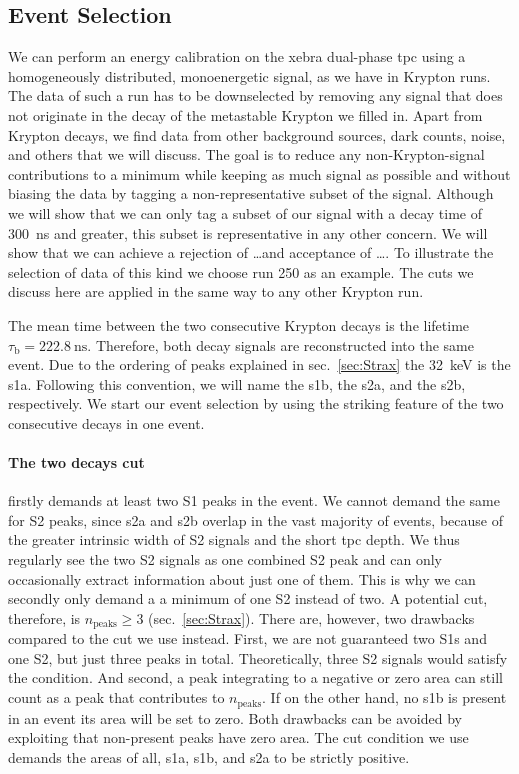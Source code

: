 
\FloatBarrier
\subsection{Event Selection}
\label{ssec:tagging}
\FloatBarrier



We can perform an energy calibration on the \gls{xebra} dual-phase \gls{tpc} using a homogeneously distributed, monoenergetic signal, as we have in Krypton runs.
The data of such a run has to be downselected by removing any signal that does not originate in the decay of the metastable Krypton we filled in.
Apart from Krypton decays, we find data from other background sources, dark counts, noise, and others that we will discuss.
The goal is to reduce any non-Krypton-signal contributions to a minimum while keeping as much signal as possible and without biasing the data by tagging a non-representative subset of the signal.
Although we will show that we can only tag a subset of our signal with a decay time of \SI{300}{\nano\s} and greater, this subset is representative in any other concern.
We will show that we can achieve a rejection of \dots and acceptance of \dots.  %
To illustrate the selection of data of this kind we choose run 250 as an example.
The cuts we discuss here are applied in the same way to any other Krypton run.


The mean time between the two consecutive Krypton decays is the lifetime $\tau_\mathrm{b} = \SI{222.8}{\nano\s}$.
Therefore, both decay signals are reconstructed into the same event.
Due to the ordering of peaks explained in sec.~\ref{sec:Strax} the \SI{32}{\kilo\eV} is the \gls{s1a}.
Following this convention, we will name the \gls{s1b}, the \gls{s2a}, and the \gls{s2b}, respectively.
We start our event selection by using the striking feature of the two consecutive decays in one event.


\paragraph{The two decays cut} firstly demands at least two S1 peaks in the event.
We cannot demand the same for S2 peaks, since \gls{s2a} and \gls{s2b} overlap in the vast majority of events, because of the greater intrinsic width of S2 signals and the short \gls{tpc} depth.
We thus regularly see the two S2 signals as one combined S2 peak and can only occasionally extract information about just one of them.
This is why we can secondly only demand a a minimum of one S2 instead of two.
A potential cut, therefore, is $n_\mathrm{peaks} \ge 3$ (sec.~\ref{sec:Strax}).
There are, however, two drawbacks compared to the cut we use instead.
First, we are not guaranteed two S1s and one S2, but just three peaks in total.
Theoretically, three S2 signals would satisfy the condition.
And second, a peak integrating to a negative or zero area can still count as a peak that contributes to $ n_\mathrm{peaks} $.
If on the other hand, no \gls{s1b} is present in an event its area will be set to zero.
Both drawbacks can be avoided by exploiting that non-present peaks have zero area.
The cut condition we use demands the areas of all, \gls{s1a}, \gls{s1b}, and \gls{s2a} to be strictly positive.

